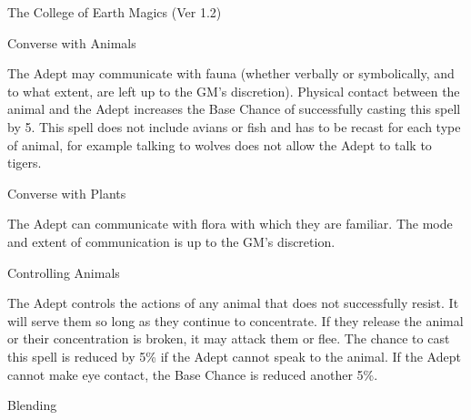 \begin{Chapter}{The College of Earth Magics (Ver 1.2)}
\begin{spell}[G-1]{Converse with Animals }

\begin{effects}
The Adept may communicate with fauna (whether verbally or
symbolically, and to what extent, are left up to the GM’s discretion).
Physical contact between the animal and the Adept increases the Base
Chance of successfully casting this spell by 5.  This spell does not
include avians or fish and has to be recast for each type of animal,
for example talking to wolves does not allow the Adept to talk to
tigers.

\end{effects}
\end{spell}

\begin{spell}[G-2]{Converse with Plants }

\begin{effects}
The Adept can communicate with flora with which they are familiar. The
mode and extent of communication is up to the GM’s discretion.

\end{effects}
\end{spell}

\begin{spell}[G-3]{Controlling Animals }

\begin{effects}
The Adept controls the actions of any animal that does not
successfully resist.  It will serve them so long as they continue to
concentrate.  If they release the animal or their concentration is
broken, it may attack them or flee.  The chance to cast this spell is
reduced by 5\% if the Adept cannot speak to the animal. If the Adept
cannot make eye contact, the Base Chance is reduced another 5\%.

\end{effects}
\end{spell}

\begin{spell}[G-4]{Blending }


\end{spell}
\end{Chapter}
